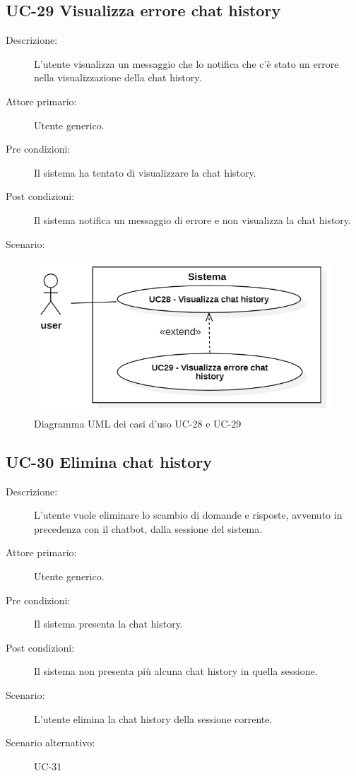 \subsection{UC-29 Visualizza errore chat history }
\begin{description}
    \item[Descrizione:] L'utente visualizza un messaggio che lo notifica che c'è stato un errore nella visualizzazione della chat history.
    \item[Attore primario:] Utente generico.
    \item[Pre condizioni:] Il sistema ha tentato di visualizzare la chat history.
    \item[Post condizioni:] Il sistema notifica un messaggio di errore e non visualizza la chat history.
    \item[Scenario:] 
\end{description}

\begin{figure}[H]
    \centering
    \includegraphics[width=0.9\linewidth]{UC28-29.PNG}
    \caption{Diagramma UML dei casi d'uso UC-28 e UC-29}
    \label{fig:UC28-29}
\end{figure}

\subsection{UC-30 Elimina chat history}
\begin{description}
    \item[Descrizione:] L'utente vuole eliminare lo scambio di domande e risposte, avvenuto in precedenza con il chatbot, dalla sessione del sistema.
    \item[Attore primario:] Utente generico.
    \item[Pre condizioni:] Il sistema presenta la chat history.
    \item[Post condizioni:] Il sistema non presenta più alcuna chat history in quella sessione.
    \item[Scenario:] L'utente elimina la chat history della sessione corrente.
    \item[Scenario alternativo:] UC-31
\end{description}

